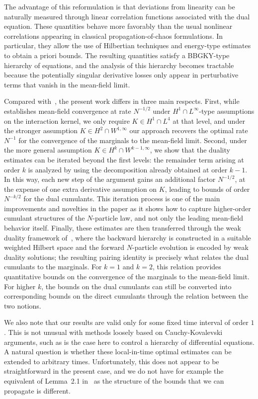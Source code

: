 \documentclass[pdflatex,sn-mathphys-num]{sn-jnl}
\theoremstyle{thmstyleone}%
\theoremstyle{thmstyletwo}%
\theoremstyle{thmstylethree}%
\begin{document}
The advantage of this reformulation is that deviations from linearity can be naturally measured through linear correlation functions associated with the dual equation. These quantities behave more favorably than the usual nonlinear correlations appearing in classical propagation-of-chaos formulations. In particular, they allow the use of Hilbertian techniques and energy-type estimates to obtain a priori bounds. The resulting quantities satisfy a BBGKY-type hierarchy of equations, and the analysis of this hierarchy becomes tractable because the potentially singular derivative losses only appear in perturbative terms that vanish in the mean-field limit.

Compared with~\cite{bresch2024duality}, the present work differs in three main respects. First, while~\cite{bresch2024duality} establishes mean-field convergence at rate \(N^{-1/2}\) under \(H^1\cap L^\infty\)-type assumptions on the interaction kernel, we only require \(K\in H^1\cap L^4\) at that level, and under the stronger assumption \(K\in H^2\cap W^{1,\infty}\) our approach recovers the optimal rate \(N^{-1}\) for the convergence of the marginals to the mean-field limit. Second, under the more general assumption \(K\in H^k\cap W^{k-1,\infty}\), we show that the duality estimates can be iterated beyond the first levels: the remainder term arising at order \(k\) is analyzed by using the decomposition already obtained at order \(k-1\). In this way, each new step of the argument gains an additional factor \(N^{-1/2}\), at the expense of one extra derivative assumption on \(K\), leading to bounds of order \(N^{-k/2}\) for the dual cumulants. This iteration process is one of the main improvements and novelties in the paper as it shows how to capture higher-order cumulant structures of the \(N\)-particle law, and not only the leading mean-field behavior itself. Finally, these estimates are then transferred through the weak duality framework of~\cite{bresch2024duality}, where the backward hierarchy is constructed in a suitable weighted Hilbert space and the forward \(N\)-particle evolution is encoded by weak duality solutions; the resulting pairing identity is precisely what relates the dual cumulants to the marginals. For \(k=1\) and \(k=2\), this relation provides quantitative bounds on the convergence of the marginals to the mean-field limit. For higher \(k\), the bounds on the dual cumulants can still be converted into corresponding bounds on the direct cumulants through the relation between the two notions. 


We also note that our results are valid only for some fixed time interval of order $1$. This is not unusual with methods loosely based on Cauchy-Kovalevski arguments, such as is the case here to control a hierarchy of differential equations. A natural question is whether these local-in-time optimal estimates can be extended to arbitrary times. Unfortunately, this does not appear to be straightforward in the present case, and we do not have for example the equivalent of Lemma~2.1 in~\cite{duerinckx2025correlation} as the structure of the bounds that we can propagate is different.
\end{document}
